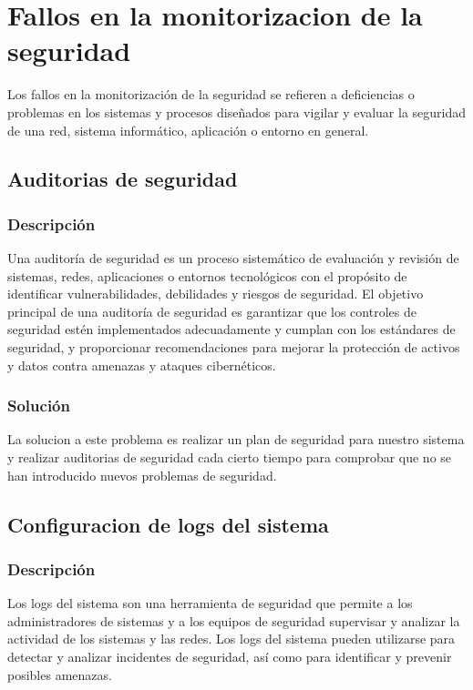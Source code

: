 \documentclass{report}
\begin{document}
        \section{Fallos en la monitorizacion de la seguridad}
            Los fallos en la monitorización de la seguridad se refieren a deficiencias o problemas en los sistemas y procesos diseñados para vigilar y evaluar la seguridad de una red, sistema informático, aplicación o entorno en general.
            \subsection{Auditorias de seguridad}
                \subsubsection{Descripción}
                    Una auditoría de seguridad es un proceso sistemático de evaluación y revisión de sistemas, redes, aplicaciones o entornos tecnológicos con el propósito de identificar vulnerabilidades, debilidades y riesgos de seguridad. El objetivo principal de una auditoría de seguridad es garantizar que los controles de seguridad estén implementados adecuadamente y cumplan con los estándares de seguridad, y proporcionar recomendaciones para mejorar la protección de activos y datos contra amenazas y ataques cibernéticos.
                \subsubsection{Solución}
                    La solucion a este problema es realizar un plan de seguridad para nuestro sistema y realizar auditorias de seguridad cada cierto tiempo para comprobar que no se han introducido nuevos problemas de seguridad.
            \clearpage
            \subsection{Configuracion de logs del sistema}
                \subsubsection{Descripción}
                    Los logs del sistema son una herramienta de seguridad que permite a los administradores de sistemas y a los equipos de seguridad supervisar y analizar la actividad de los sistemas y las redes. Los logs del sistema pueden utilizarse para detectar y analizar incidentes de seguridad, así como para identificar y prevenir posibles amenazas.
\end{document}
